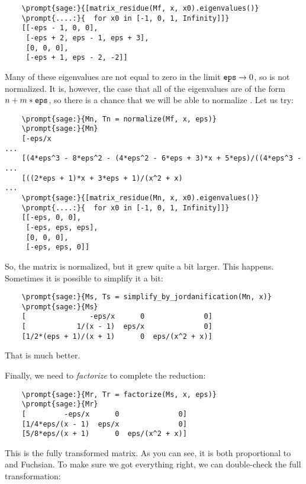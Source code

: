 \documentclass[12pt,a4paper]{article}
\begin{document}
\begin{Verbatim}
    \prompt{sage:}{[matrix_residue(Mf, x, x0).eigenvalues()}
    \prompt{....:}{  for x0 in [-1, 0, 1, Infinity]]}
    [[-eps - 1, 0, 0],
     [-eps + 2, eps - 1, eps + 3],
     [0, 0, 0],
     [-eps + 1, eps - 2, -2]]
\end{Verbatim}

Many of these eigenvalues are not equal to zero in the limit $\texttt{eps}\to0$, so  is not normalized.
It is, however, the case that all of the eigenvalues are of the form $n + m*\texttt{eps}$, so there is a chance that we will be able to normalize .
Let us try:

\begin{Verbatim}
    \prompt{sage:}{Mn, Tn = normalize(Mf, x, eps)}
    \prompt{sage:}{Mn}
    [-eps/x                                                            ...
    [(4*eps^3 - 8*eps^2 - (4*eps^2 - 6*eps + 3)*x + 5*eps)/((4*eps^3 - ...
    [((2*eps + 1)*x + 3*eps + 1)/(x^2 + x)                             ...
    \prompt{sage:}{[matrix_residue(Mn, x, x0).eigenvalues()}
    \prompt{....:}{  for x0 in [-1, 0, 1, Infinity]]}
    [[-eps, 0, 0],
     [-eps, eps, eps],
     [0, 0, 0],
     [-eps, eps, 0]]
\end{Verbatim}

So, the matrix is normalized, but it grew quite a bit larger.
This happens.
Sometimes it is possible to simplify it a bit:

\begin{Verbatim}
    \prompt{sage:}{Ms, Ts = simplify_by_jordanification(Mn, x)}
    \prompt{sage:}{Ms}
    [               -eps/x      0              0]
    [            1/(x - 1)  eps/x              0]
    [1/2*(eps + 1)/(x + 1)      0  eps/(x^2 + x)]
\end{Verbatim}

That is much better.

Finally, we need to \textit{factorize}  to complete the reduction:

\begin{Verbatim}
    \prompt{sage:}{Mr, Tr = factorize(Ms, x, eps)}
    \prompt{sage:}{Mr}
    [         -eps/x      0              0]
    [1/4*eps/(x - 1)  eps/x              0]
    [5/8*eps/(x + 1)      0  eps/(x^2 + x)]
\end{Verbatim}

This is the fully transformed matrix.
As you can see, it is both proportional to  and Fuchsian.
To make sure we got everything right, we can double-check the full transformation:
\end{document}
